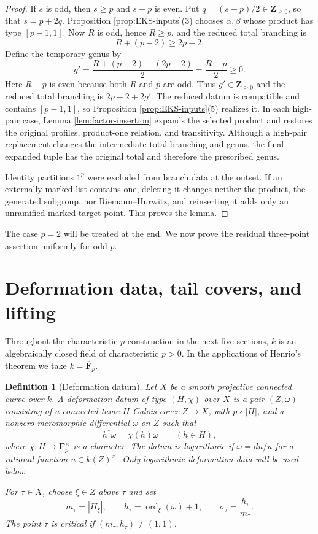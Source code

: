 \documentclass[10pt,a4paper]{amsart}
\newtheorem{definition}[theorem]{Definition}
\numberwithin{equation}{section}
\begin{document}
\begin{proof}
If $s$ is odd, then $s\geq p$ and $s-p$ is even.  Put
$q=(s-p)/2\in\mathbf Z_{\geq0}$, so that $s=p+2q$.  Proposition
\ref{prop:EKS-inputs}(3) chooses $\alpha,\beta$ whose product has type
$[p-1,1]$.  Now $R$ is odd, hence $R\geq p$,
and the reduced total branching is
\[
 R+(p-2)\geq2p-2.
\]
Define the temporary genus by
\[
 g'=\frac{R+(p-2)-(2p-2)}2=\frac{R-p}{2}\geq0.
\]
Here $R-p$ is even because both $R$ and $p$ are odd.  Thus
$g'\in\mathbf Z_{\geq0}$ and the reduced total branching is
$2p-2+2g'$.  The reduced datum is compatible and contains $[p-1,1]$, so
Proposition \ref{prop:EKS-inputs}(5) realizes it.
In each high-pair case, Lemma \ref{lem:factor-insertion} expands the selected
product and restores the original profiles, product-one relation, and
transitivity.  Although a high-pair
replacement changes the intermediate total branching and genus, the final
expanded tuple has the original total and therefore the prescribed genus.

Identity partitions $1^p$ were excluded from branch data at the outset.  If
an externally marked list contains one, deleting it changes neither the
product, the generated subgroup, nor Riemann--Hurwitz, and reinserting it adds
only an unramified marked target point.  This proves the lemma.
\end{proof}

The case $p=2$ will be treated at the end.  We now prove the residual
three-point assertion uniformly for odd $p$.

\section{Deformation data, tail covers, and lifting}

Throughout the characteristic-$p$ construction in the next five sections,
$k$ is an algebraically closed field of characteristic $p>0$.  In the
applications of Henrio's theorem we take $k=\overline{\mathbf F}_p$.

\begin{definition}[Deformation datum]\label{def:deformation-datum}
Let $X$ be a smooth projective connected curve over $k$.  A deformation
datum of type $(H,\chi)$ over $X$ is a pair $(Z,\omega)$ consisting of a
connected tame $H$-Galois cover $Z\to X$, with $p\nmid |H|$, and a nonzero
meromorphic differential $\omega$ on $Z$ such that
\[
 h^*\omega=\chi(h)\omega\qquad(h\in H),
\]
where $\chi:H\to\mathbf F_p^\times$ is a character.  The datum is
logarithmic if $\omega=du/u$ for a rational function $u\in k(Z)^\times$.
Only logarithmic deformation data will be used below.

For $\tau\in X$, choose $\xi\in Z$ above $\tau$ and set
\[
 m_\tau=|H_\xi|,\qquad
 h_\tau=\operatorname{ord}_\xi(\omega)+1,\qquad
 \sigma_\tau=\frac{h_\tau}{m_\tau}.
\]
The point $\tau$ is critical if $(m_\tau,h_\tau)\ne(1,1)$.
\end{definition}
\end{document}
